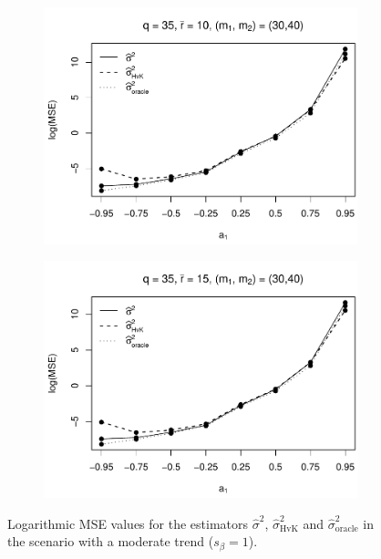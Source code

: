 \begin{figure}[p]
\begin{subfigure}[b]{0.45\textwidth}
\includegraphics[width=\textwidth]{Plots/Robustness/MSE_lrv_T=500_slope=1_(q,K1,K2,M1,M2)=(35,2,10,30,40).pdf}
\end{subfigure}
\hspace{0.25cm}
\begin{subfigure}[b]{0.45\textwidth}
\includegraphics[width=\textwidth]{Plots/Robustness/MSE_lrv_T=500_slope=1_(q,K1,K2,M1,M2)=(35,2,15,30,40).pdf}
\end{subfigure}
\caption{Logarithmic MSE values for the estimators $\widehat{\sigma}^2$, $\widehat{\sigma}^2_{\text{HvK}}$ and $\widehat{\sigma}^2_{\text{oracle}}$ in the scenario with a moderate trend ($s_\beta=1$).}\label{fig:MSE_slope1_lrv_robust}
\end{figure}



